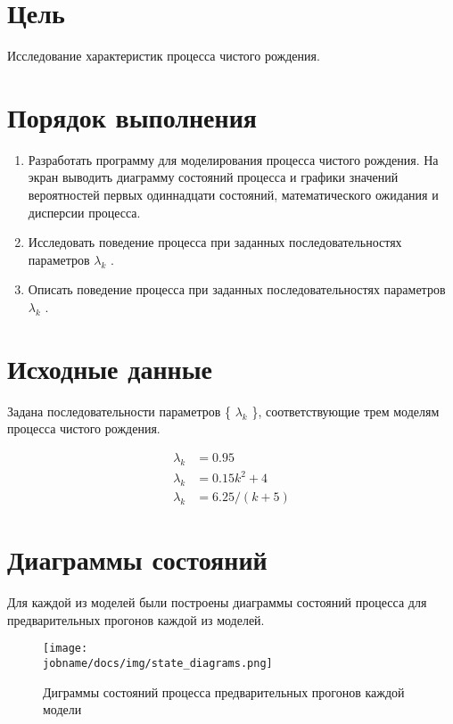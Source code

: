 \section*{Цель}

Исследование характеристик процесса чистого рождения.

\section*{Порядок выполнения}

\begin{enumerate}
    \item Разработать программу для моделирования процесса чистого рождения. На экран выводить диаграмму состояний процесса и графики значений вероятностей первых одиннадцати состояний, математического ожидания и дисперсии процесса.
    \item Исследовать поведение процесса при заданных последовательностях параметров { $\lambda_k$ }.
    \item Описать поведение процесса при заданных последовательностях параметров { $\lambda_k$ }.
\end{enumerate}

\section*{Исходные данные}

Задана последовательности параметров \{ $\lambda_k$ \}, соответствующие трем моделям процесса чистого рождения.

\begin{align*}
    \lambda_k & = 0.95\\
    \lambda_k & = 0.15k^2 + 4\\
    \lambda_k & = 6.25 / (k+5)
\end{align*}

\section*{Диаграммы состояний}

Для каждой из моделей были построены диаграммы состояний процесса для предварительных прогонов каждой из моделей.

\begin{figure}[h!]
    \centering
    \texttt{[image: \\jobname/docs/img/state\_diagrams.png]}
    \caption{Диграммы состояний процесса предварительных прогонов каждой модели}
\end{figure}

